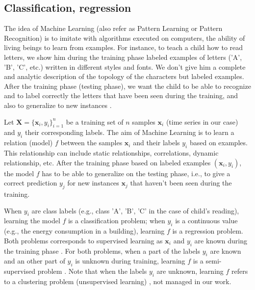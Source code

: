 \subsection{Classification, regression}
The idea of Machine Learning (also refer as Pattern Learning or Pattern Recognition) is to imitate with algorithms executed on computers, the ability of living beings to learn from examples. For instance, to teach a child how to read letters, we show him during the training phase labeled examples of letters ('A', 'B', 'C', etc.) written in different styles and fonts. We don't give him a complete and analytic description of the topology of the characters but labeled examples. After the training phase (testing phase), we want the child to be able to recognize and to label correctly the letters that have been seen during the training, and also to generalize to new instances \cite{Dreyfus2006}. 

Let $\textbf{X}=\{\textbf{x}_i,y_i\}_{i=1}^n$ be a training set of $n$ samples $\textbf{x}_i$ (time series in our case) and $y_i$ their corresponding labels. The aim of Machine Learning is to learn a relation (model) $f$ between the samples $\textbf{x}_i$ and their labels $y_i$ based on examples. This relationship can include static relationships, correlations, dynamic relationship, etc. After the training phase based on labeled examples $(\textbf{x}_i,y_i)$, the model $f$ has to be able to generalize on the testing phase, i.e., to give a correct prediction $y_j$ for new instances $\textbf{x}_j$ that haven't been seen during the training.

When $y_i$ are class labels (e.g., class 'A', 'B', 'C' in the case of child's reading), learning the model $f$ is a classification problem; when $y_i$ is a continuous value (e.g., the energy consumption in a building), learning $f$ is a regression problem. Both problems corresponds to supervised learning as $\textbf{x}_i$ and $y_i$ are known during the training phase \cite{Bishop2006,Dreyfus2006,Duda1973}. For both problems, when a part of the labels $y_i$ are known and an other part of $y_i$ is unknown during training, learning $f$ is a semi-supervised problem . Note that when the labels $y_i$ are unknown, learning $f$ refers to a clustering problem (unsupervised learning) \cite{Jain1999,Chen1996}, not managed in our work.




